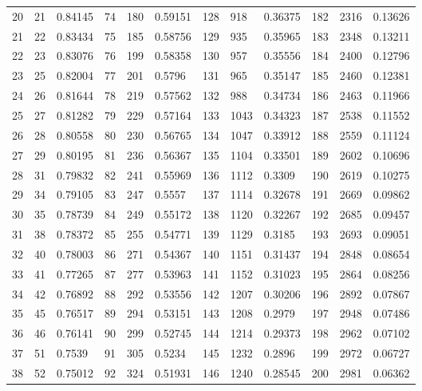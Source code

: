 \documentclass[12pt]{elegantbook}
\begin{document}
\begin{exercise*}[3]
{\begin{longtable}[c]{lll|lll|lll|lll}
    20  & 21   & 0.84145  & 74  & 180  & 0.59151  & 128 & 918  & 0.36375  & 182 & 2316 & 0.13626  \\
    21  & 22   & 0.83434  & 75  & 185  & 0.58756  & 129 & 935  & 0.35965  & 183 & 2348 & 0.13211  \\
    22  & 23   & 0.83076  & 76  & 199  & 0.58358  & 130 & 957  & 0.35556  & 184 & 2400 & 0.12796  \\
    23  & 25   & 0.82004  & 77  & 201  & 0.5796   & 131 & 965  & 0.35147  & 185 & 2460 & 0.12381  \\
    24  & 26   & 0.81644  & 78  & 219  & 0.57562  & 132 & 988  & 0.34734  & 186 & 2463 & 0.11966  \\
    25  & 27   & 0.81282  & 79  & 229  & 0.57164  & 133 & 1043 & 0.34323  & 187 & 2538 & 0.11552  \\
    26  & 28   & 0.80558  & 80  & 230  & 0.56765  & 134 & 1047 & 0.33912  & 188 & 2559 & 0.11124  \\
    27  & 29   & 0.80195  & 81  & 236  & 0.56367  & 135 & 1104 & 0.33501  & 189 & 2602 & 0.10696  \\
    28  & 31   & 0.79832  & 82  & 241  & 0.55969  & 136 & 1112 & 0.3309   & 190 & 2619 & 0.10275  \\
    29  & 34   & 0.79105  & 83  & 247  & 0.5557   & 137 & 1114 & 0.32678  & 191 & 2669 & 0.09862  \\
    30  & 35   & 0.78739  & 84  & 249  & 0.55172  & 138 & 1120 & 0.32267  & 192 & 2685 & 0.09457  \\
    31  & 38   & 0.78372  & 85  & 255  & 0.54771  & 139 & 1129 & 0.3185   & 193 & 2693 & 0.09051  \\
    32  & 40   & 0.78003  & 86  & 271  & 0.54367  & 140 & 1151 & 0.31437  & 194 & 2848 & 0.08654  \\
    33  & 41   & 0.77265  & 87  & 277  & 0.53963  & 141 & 1152 & 0.31023  & 195 & 2864 & 0.08256  \\
    34  & 42   & 0.76892  & 88  & 292  & 0.53556  & 142 & 1207 & 0.30206  & 196 & 2892 & 0.07867  \\
    35  & 45   & 0.76517  & 89  & 294  & 0.53151  & 143 & 1208 & 0.2979   & 197 & 2948 & 0.07486  \\
    36  & 46   & 0.76141  & 90  & 299  & 0.52745  & 144 & 1214 & 0.29373  & 198 & 2962 & 0.07102  \\
    37  & 51   & 0.7539   & 91  & 305  & 0.5234   & 145 & 1232 & 0.2896   & 199 & 2972 & 0.06727  \\
    38  & 52   & 0.75012  & 92  & 324  & 0.51931  & 146 & 1240 & 0.28545  & 200 & 2981 & 0.06362  \\

\end{longtable}}
\end{exercise*}
\end{document}
